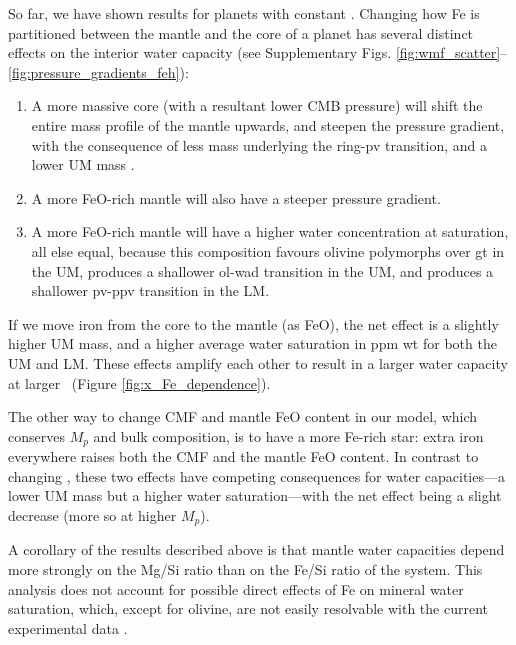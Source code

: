 So far, we have shown results for planets with constant \coreeff. Changing how Fe is partitioned between the mantle and the core of a planet has several distinct effects on the interior water capacity (see Supplementary Figs. \ref{fig:wmf_scatter}--\ref{fig:pressure_gradients_feh}):

\begin{enumerate}
    \item A more massive core (with a resultant lower CMB pressure) will shift the entire mass profile of the mantle upwards, and steepen the pressure gradient, with the consequence of less mass underlying the ring-pv transition, and a lower UM mass \citep{unterborn_scaling_2016, unterborn_pressure_2019}.
    \item A more FeO-rich mantle will also have a steeper pressure gradient.
    \item A more FeO-rich mantle will have a higher water concentration at saturation, all else equal, because this composition favours olivine polymorphs over gt in the UM, produces a shallower ol-wad transition in the UM, and produces a shallower pv-ppv transition in the LM.
\end{enumerate}

If we move iron from the core to the mantle (as FeO), the net effect is a slightly higher UM mass, and a higher average water saturation in ppm wt for both the UM and LM. These effects amplify each other to result in a larger water capacity at larger \coreeff~(Figure \ref{fig:x_Fe_dependence}).

The other way to change CMF and mantle FeO content in our model, which conserves $M_p$ and bulk composition, is to have a more Fe-rich star: extra iron everywhere raises both the CMF and the mantle FeO content. In contrast to changing \coreeff, these two effects have competing consequences for water capacities---a lower UM mass but a higher water saturation---with the net effect being a slight decrease (more so at higher $M_p$). 

A corollary of the results described above is that mantle water capacities depend more strongly on the Mg/Si ratio than on the Fe/Si ratio of the system. This analysis does not account for possible direct effects of Fe on mineral water saturation, which, except for olivine, are not easily resolvable with the current experimental data \citep{dong_water_2022}.



